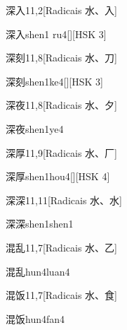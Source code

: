 \begin{entry}{深入}{11,2}[Radicais ⽔、⼊]
  \begin{phonetics}{深入}{shen1 ru4}[][HSK 3]
  \end{phonetics}
\end{entry}

\begin{entry}{深刻}{11,8}[Radicais ⽔、⼑]
  \begin{phonetics}{深刻}{shen1ke4}[][HSK 3]
  \end{phonetics}
\end{entry}

\begin{entry}{深夜}{11,8}[Radicais ⽔、⼣]
  \begin{phonetics}{深夜}{shen1ye4}
  \end{phonetics}
\end{entry}

\begin{entry}{深厚}{11,9}[Radicais ⽔、⼚]
  \begin{phonetics}{深厚}{shen1hou4}[][HSK 4]
  \end{phonetics}
\end{entry}

\begin{entry}{深深}{11,11}[Radicais ⽔、⽔]
  \begin{phonetics}{深深}{shen1shen1}
  \end{phonetics}
\end{entry}

\begin{entry}{混乱}{11,7}[Radicais ⽔、⼄]
  \begin{phonetics}{混乱}{hun4luan4}
  \end{phonetics}
\end{entry}

\begin{entry}{混饭}{11,7}[Radicais ⽔、⾷]
  \begin{phonetics}{混饭}{hun4fan4}
  \end{phonetics}
\end{entry}

